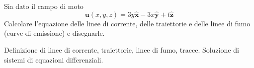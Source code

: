\begin{exerciseS}
 Sia dato il campo di moto
\begin{equation}
 \bm{u}(x,y,z) = 3y \bm{\hat{x}} - 3x \bm{\hat{y}} +t\bm{\hat{z}}
\end{equation}
Calcolare l'equazione delle linee di corrente, delle traiettorie e delle linee di fumo (curve di emissione) e disegnarle.
\end{exerciseS}


\sol

\partone Definizione di linee di corrente, traiettorie, linee di fumo, tracce. Soluzione di sistemi di equazioni differenziali.





